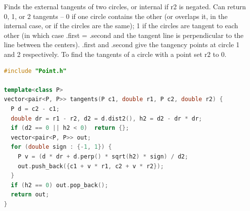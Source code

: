 Finds the external tangents of two circles, or internal if r2 is negated.
Can return 0, 1, or 2 tangents -- 0 if one circle contains the other (or overlaps it, in the internal case, or if the circles are the same);
1 if the circles are tangent to each other (in which case .first = .second and the tangent line is perpendicular to the line between the centers).
.first and .second give the tangency points at circle 1 and 2 respectively.
To find the tangents of a circle with a point set r2 to 0. 
\begin{lstlisting}[style=codebook, language=C++]
#include "Point.h"

template<class P>
vector<pair<P, P>> tangents(P c1, double r1, P c2, double r2) {
  P d = c2 - c1;
  double dr = r1 - r2, d2 = d.dist2(), h2 = d2 - dr * dr;
  if (d2 == 0 || h2 < 0)  return {};
  vector<pair<P, P>> out;
  for (double sign : {-1, 1}) {
    P v = (d * dr + d.perp() * sqrt(h2) * sign) / d2;
    out.push_back({c1 + v * r1, c2 + v * r2});
  }
  if (h2 == 0) out.pop_back();
  return out;
}
\end{lstlisting}
